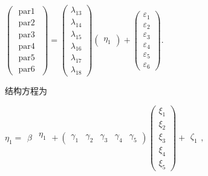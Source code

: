 \documentclass[withoutpreface,bwprint]{cumcmthesis} %
\begin{document}
\begin{center}
$
\left(\begin{array}{c}
	\text { par1 }  \\
	\text { par2 }  \\
	\text { par3 }  \\
	\text { par4 }  \\
	\text { par5 }  \\
	\text { par6 } 
\end{array}\right)=\left(\begin{array}{c}
	\lambda_{13} \\
	\lambda_{14} \\
	\lambda_{15} \\
	\lambda_{16} \\
	\lambda_{17} \\
	\lambda_{18}
\end{array}\right)\left(\begin{array}{c}
	\eta_{1}
\end{array}\right)+\left(\begin{array}{c}
	\varepsilon_{1} \\
	\varepsilon_{2} \\
	\varepsilon_{3} \\
	\varepsilon_{4} \\
	\varepsilon_{5} \\
	\varepsilon_{6}
\end{array}\right)
.$

\end{center}
结构方程为
\begin{center}
$
\eta_{1}=\begin{array}{c}
	\beta
\end{array}\begin{array}{c}
	\eta_{1} \\
	
\end{array}+\left(\begin{array}{ccccc}
	\gamma_{1} & \gamma_{2} & \gamma_{3} & \gamma_{4} & \gamma_{5}
\end{array}\right)\left(\begin{array}{c}
	\xi_{1} \\
	\xi_{2} \\
	\xi_{3} \\
	\xi_{4} \\
	\xi_{5}
\end{array}\right)+\begin{array}{c}
	\zeta_{1}
\end{array}
,$
\end{center}
\end{document}

